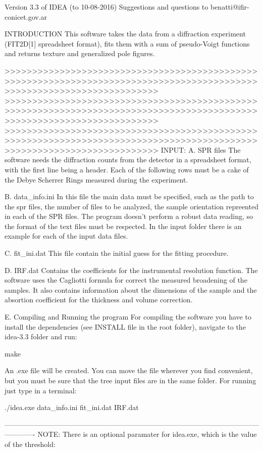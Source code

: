 Version 3.3 of IDEA (to 10-08-2016)
Suggestions and questions to benatti@ifir-conicet.gov.ar

INTRODUCTION
This software takes the data from a diffraction experiment (FIT2D[1] spreadsheet format), fits them with a sum of pseudo-Voigt functions and returns texture and 
generalized pole figures.

>>>>>>>>>>>>>>>>>>>>>>>>>>>>>>>>>>>>>>>>>>>>>>>>>>>>>>>>>>>>>>>>>>>>>>>>>>>>>>>>>>>>>>>>>>>>>>>>>>>>>>>>>>>>>>>>>>>>>>>>
>>>>>>>>>>>>>>>>>>>>>>>>>>>>>>>>>>>>>>>>>>>>>>>>>>>>>>>>>>>>>>>>>>>>>>>>>>>>>>>>>>>>>>>>>>>>>>>>>>>>>>>>>>>>>>>>>>>>>>>>
>>>>>>>>>>>>>>>>>>>>>>>>>>>>>>>>>>>>>>>>>>>>>>>>>>>>>>>>>>>>>>>>>>>>>>>>>>>>>>>>>>>>>>>>>>>>>>>>>>>>>>>>>>>>>>>>>>>>>>>>
INPUT:
A. SPR files
The software needs the diffraction counts from the detector in a spreadsheet format, with the first line being a header. Each of the following rows must be a cake of the Debye Scherrer Rings measured during the experiment.

B. data_info.ini
In this file the main data must be specified, such as the path to the spr files, the number of files to be analyzed, the sample orientation repreented in each of the SPR files. The program doesn't perform a robust data reading, so the format of the text files must be respected. In the input folder there is an example for each of the input data files.

C. fit_ini.dat
This file contain the initial guess for the fitting procedure.

D. IRF.dat
Contains the coefficients for the instrumental resolution function. The software uses the Cagliotti formula for correct the measured broadening of the samples. It also contains information about the dimensions of the sample and the absortion coefficient for the thickness and volume correction.

E. Compiling and Running the program
For compiling the software you have to install the dependencies (see INSTALL file in the root folder), navigate to the idea-3.3 folder and run:

make

An .exe file will be created. You can move the file wherever you find convenient, but you must be sure that the tree input files are in the same folder. For running just type in a terminal:

./idea.exe data_info.ini fit_ini.dat IRF.dat

-------------------------------------------------------------------------------------------------------------------------
NOTE: There is an optional paramater for idea.exe, which is the value of the threshold:

